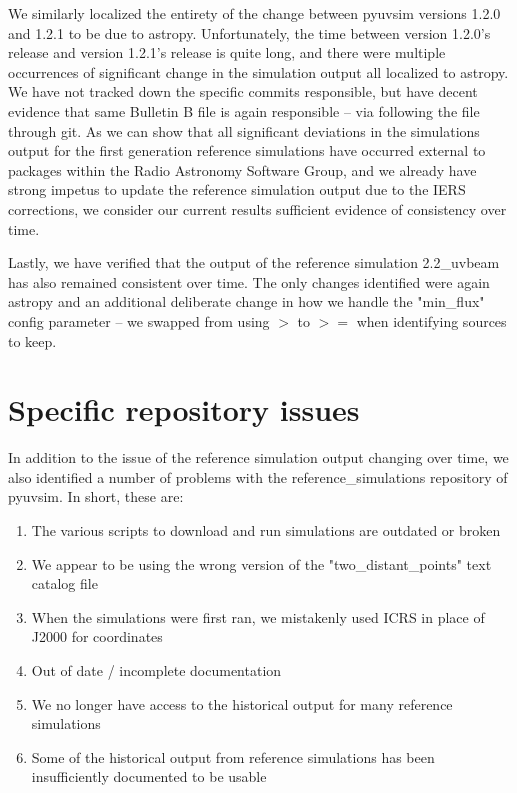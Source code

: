 \documentclass[]{article}
\begin{document}
We similarly localized the entirety of the change between pyuvsim versions 1.2.0 and 1.2.1 to be due to astropy. Unfortunately, the time between version 1.2.0's release and version 1.2.1's release is quite long, and there were multiple occurrences of significant change in the simulation output all localized to astropy. We have not tracked down the specific commits responsible, but have decent evidence that same Bulletin B file is again responsible -- via following the file through git. As we can show that all significant deviations in the simulations output for the first generation reference simulations have occurred external to packages within the Radio Astronomy Software Group, and we already have strong impetus to update the reference simulation output due to the IERS corrections, we consider our current results sufficient evidence of consistency over time.

Lastly, we have verified that the output of the reference simulation 2.2\_uvbeam has also remained consistent over time. The only changes identified were again astropy and an additional deliberate change in how we handle the "min\_flux" config parameter -- we swapped from using $>$ to $>=$ when identifying sources to keep.

\section{Specific repository issues}

In addition to the issue of the reference simulation output changing over time, we also identified a number of problems with the reference\_simulations repository of pyuvsim. In short, these are:
\begin{enumerate}[label=$\bullet$]
    \item The various scripts to download and run simulations are outdated or broken
    \item We appear to be using the wrong version of the "two\_distant\_points" text catalog file
    \item When the simulations were first ran, we mistakenly used ICRS in place of J2000 for coordinates
    \item Out of date / incomplete documentation
    \item We no longer have access to the historical output for many reference simulations
    \item Some of the historical output from reference simulations has been insufficiently documented to be usable
\end{enumerate}
\end{document}
